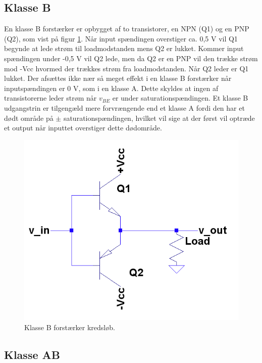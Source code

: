 \subsection{Klasse B}
En klasse B forstærker er opbygget af to transistorer, en NPN (Q1) og en PNP (Q2), som vist på figur \ref{fig:classb}. Når input spændingen overstiger ca. 0,5 V vil Q1 begynde at lede strøm til loadmodstanden mens Q2 er lukket. Kommer input spændingen under -0,5 V vil Q2 lede, men da Q2 er en PNP vil den trække strøm mod -Vcc hvormed der trækkes strøm fra loadmodstanden. Når Q2 leder er Q1 lukket. 
Der afsættes ikke nær så meget effekt i en klasse B forstærker når inputspændingen er 0 V, som i en klasse A. Dette skyldes at ingen af transistorerne leder strøm når $v_{BE} $ er under saturationspændingen. Et klasse B udgangstrin er tilgengæld mere forvrængende end et klasse A fordi den har et dødt område på  $\pm$ saturationspændingen, hvilket vil sige at der først vil optræde et output når inputtet overstiger dette dødområde.  

\begin{figure}[h]
\centering
\includegraphics[scale=.35]{indledende_analyse/klasser/classb.png}
\caption{Klasse B forstærker kredsløb.}
\label{fig:classb}
\end{figure}

\subsection{Klasse AB}

